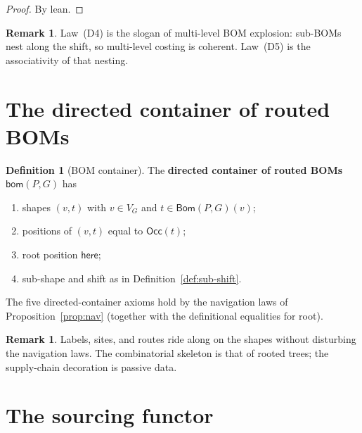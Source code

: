 \documentclass[11pt,a4paper]{article}
\theoremstyle{plain}
\theoremstyle{definition}
\newtheorem{definition}[theorem]{Definition}
\newtheorem{remark}[theorem]{Remark}
\newcommand{\Bom}{\mathsf{Bom}}
\newcommand{\bom}{\mathsf{bom}}
\newcommand{\Occ}{\mathsf{Occ}}
\begin{document}
\begin{proof}
By lean.
\end{proof}

\begin{remark}
Law~(D4) is the slogan of multi-level BOM explosion: sub-BOMs nest along
the shift, so multi-level costing is coherent. Law~(D5) is the
associativity of that nesting.
\end{remark}

\section{The directed container of routed BOMs}

\begin{definition}[BOM container]\label{def:bom-dc}
The \textbf{directed container of routed BOMs} $\bom(P,G)$ has
\begin{enumerate}
  \item shapes $(v,t)$ with $v \in V_G$ and $t \in \Bom(P,G)(v)$;
  \item positions of $(v,t)$ equal to $\Occ(t)$;
  \item root position $\mathsf{here}$;
  \item sub-shape and shift as in Definition~\ref{def:sub-shift}.
\end{enumerate}
The five directed-container axioms hold by the navigation laws of
Proposition~\ref{prop:nav} (together with the definitional equalities for
root).
\end{definition}

\begin{remark}
Labels, sites, and routes ride along on the shapes without disturbing the
navigation laws. The combinatorial skeleton is that of rooted trees; the
supply-chain decoration is passive data.
\end{remark}

\section{The sourcing functor}
\end{document}
